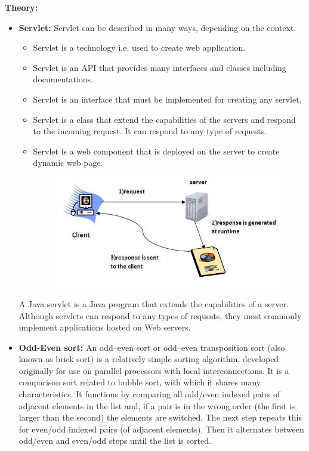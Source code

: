 \documentclass[a4paper,12pt]{article}
\begin{document}
\noindent \textbf{Theory:}\\
\begin{itemize}
\item \textbf{Servlet:}
Servlet can be described in many ways, depending on the context.
\begin{itemize}
\item Servlet is a technology i.e. used to create web application.
\item Servlet is an API that provides many interfaces and classes including documentations.
\item Servlet is an interface that must be implemented for creating any servlet.
\item Servlet is a class that extend the capabilities of the servers and respond to the incoming request. It can respond to any type of requests.
\item Servlet is a web component that is deployed on the server to create dynamic web page.
\begin{figure}[h!]
		\centering
		\includegraphics[scale=0.5]{response.JPG}
	\end{figure}
\end{itemize}
A Java servlet is a Java program that extends the capabilities of a server. Although servlets can respond to any types of requests, they most commonly implement applications hosted on Web servers.
\end{itemize}

\begin{itemize}
\item \textbf{Odd-Even sort:}
An odd–even sort or odd–even transposition sort (also known as brick sort) is a relatively simple sorting algorithm, developed originally for use on parallel processors with local interconnections. It is a comparison sort related to bubble sort, with which it shares many characteristics. It functions by comparing all odd/even indexed pairs of adjacent elements in the list and, if a pair is in the wrong order (the first is larger than the second) the elements are switched. The next step repeats this for even/odd indexed pairs (of adjacent elements). Then it alternates between odd/even and even/odd steps until the list is sorted.
\end{itemize}
\end{document}
